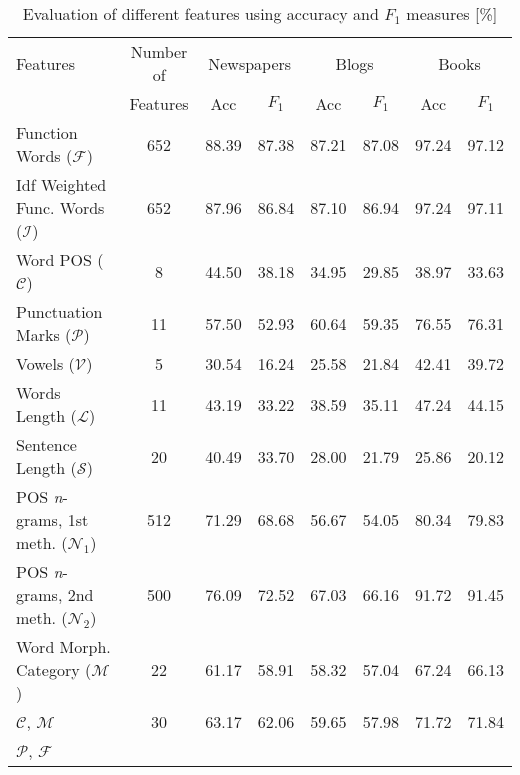 \documentclass{llncs}
\begin{document}
\begin{table*}[htb]
\normalsize\caption{Evaluation of different features using accuracy and $F_1$ measures [\%]}
\scriptsize
\centering
\begin{tabular}{l c c c c c c c}%
\toprule%
Features & Number of & \multicolumn{2}{c}{Newspapers} &
\multicolumn{2}{c}{Blogs} & \multicolumn{2}{c}{Books}\\ & Features &
\hspace{5pt} Acc \hspace{5pt} & \hspace{5pt} $F_1$ \hspace{5pt} & \hspace{5pt} Acc \hspace{5pt} & \hspace{5pt} $F_1$ \hspace{5pt} & \hspace{5pt} Acc \hspace{5pt} & \hspace{5pt} $F_1$ \hspace{5pt}\\
\midrule
Function Words ($\mathcal{F}$) & 652 & 88.39 & 87.38 & 87.21 & 87.08 & 97.24 &
97.12 \\ Idf Weighted Func. Words ($\mathcal{I}$) & 652 & 87.96 & 86.84 & 87.10
& 86.94 & 97.24 & 97.11 \\ Word POS ($\mathcal{C}$) & 8 & 44.50 & 38.18 & 34.95
& 29.85 & 38.97 & 33.63 \\ Punctuation Marks ($\mathcal{P}$) & 11 & 57.50 &
52.93 & 60.64 & 59.35 & 76.55 & 76.31 \\ Vowels ($\mathcal{V}$) & 5 & 30.54 & 16.24 &
25.58 & 21.84 & 42.41 & 39.72 \\ Words Length ($\mathcal{L}$) & 11 & 43.19 &
33.22 & 38.59 & 35.11 & 47.24 & 44.15 \\ Sentence Length ($\mathcal{S}$) & 20 &
40.49 & 33.70 & 28.00 & 21.79 & 25.86 & 20.12 \\ POS \emph{n}-grams, 1st
meth. ($\mathcal{N}_1$) & 512 & 71.29 & 68.68 & 56.67 & 54.05 & 80.34 & 79.83 \\
POS \emph{n}-grams, 2nd meth. ($\mathcal{N}_2$) & 500 & 76.09 & 72.52 & 67.03 &
66.16 & 91.72 & 91.45 \\ Word Morph. Category ($\mathcal{M}$) & 22 & 61.17
& 58.91 & 58.32 & 57.04 & 67.24 & 66.13 \\ $\mathcal{C}$, $\mathcal{M}$ & 30 &
63.17 & 62.06 & 59.65 & 57.98 & 71.72 & 71.84 \\ $\mathcal{P}$, $\mathcal{F}$ &

\end{tabular}
\end{table*}
\end{document}

